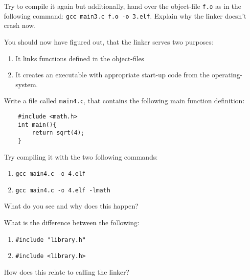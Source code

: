 \documentclass{dcbl/challenge}
\begin{document}
\begin{aufgabe}
    Try to compile it again but additionally, hand over the object-file \texttt{f.o} as in the following command: \texttt{gcc main3.c f.o -o 3.elf}.
    Explain why the linker doesn't crash now.
\end{aufgabe}

\begin{aufgabe}
    You should now have figured out, that the linker serves two purposes:
    \begin{enumerate}
        \item It links functions defined in the object-files
        \item It creates an executable with appropriate start-up code from the operating-system.
    \end{enumerate}
    Write a file called \texttt{main4.c}, that contains the following main function definition:
    \begin{lstlisting}
    #include <math.h>
    int main(){
        return sqrt(4);
    }
    \end{lstlisting}
    Try compiling it with the two following commands:
    \begin{enumerate}
        \item \texttt{gcc main4.c -o 4.elf}
        \item \texttt{gcc main4.c -o 4.elf -lmath}
    \end{enumerate}
    What do you see and why does this happen?
\end{aufgabe}

\begin{aufgabe}
    What is the difference between the following:
    \begin{enumerate}
        \item \texttt{\#include "library.h"}
        \item \texttt{\#include <library.h>}
    \end{enumerate}
    How does this relate to calling the linker?
\end{aufgabe}
\end{document}
